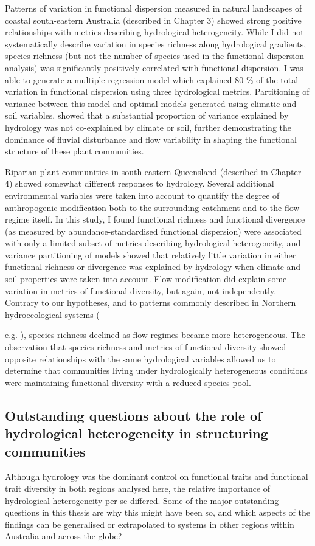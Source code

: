 {Patterns of variation in functional dispersion measured in natural landscapes of coastal south-eastern Australia (described in Chapter 3) showed strong positive relationships with metrics describing hydrological heterogeneity. While I did not systematically describe variation in species richness along hydrological gradients, species richness (but not the number of species used in the functional dispersion analysis) was significantly positively correlated with functional dispersion. I was able to generate a multiple regression model which explained 80 \% of the total variation in functional dispersion using three hydrological metrics. Partitioning of variance between this model and optimal models generated using climatic and soil variables, showed that a substantial proportion of variance explained by hydrology was not co-explained by climate or soil, further demonstrating the dominance of fluvial disturbance and flow variability in shaping the functional structure of these plant communities.

Riparian plant communities in south-eastern Queensland (described in Chapter 4) showed somewhat different responses to hydrology. Several additional environmental variables were taken into account to quantify the degree of anthropogenic modification both to the surrounding catchment and to the flow regime itself. In this study, I found functional richness and functional divergence (as measured by abundance-standardised functional dispersion) were associated with only a limited subset of metrics describing hydrological heterogeneity, and variance partitioning of models showed that relatively little variation in either functional richness or divergence was explained by hydrology when climate and soil properties were taken into account. Flow modification did explain some variation in metrics of functional diversity, but again, not independently. Contrary to our hypotheses, and to patterns commonly described in Northern hydroecological systems ({e.g. \citet{Naiman1997}), species richness declined as flow regimes became more heterogeneous. The observation that species richness and metrics of functional diversity showed opposite relationships with the same hydrological variables allowed us to determine that communities living under hydrologically heterogeneous conditions were maintaining functional diversity with a reduced species pool. 

\subsection{Outstanding questions about the role of hydrological heterogeneity in structuring communities}
Although hydrology was the dominant control on functional traits and functional trait diversity in both regions analysed here, the relative importance of hydrological heterogeneity per se differed. Some of the major outstanding questions in this thesis are why this might have been so, and which aspects of the findings can be generalised or extrapolated to systems in other regions within Australia and across the globe?

}}
